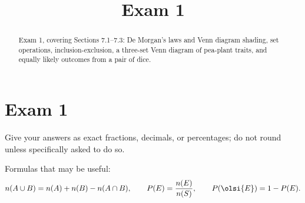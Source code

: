 \documentclass[12pt]{ximera}
\title{Exam 1}
\begin{document}
\begin{abstract}
Exam 1, covering Sections 7.1--7.3: De Morgan's laws and Venn diagram shading, set
operations, inclusion-exclusion, a three-set Venn diagram of pea-plant traits, and
equally likely outcomes from a pair of dice.
\end{abstract}
\maketitle

\section*{Exam 1}

Give your answers as exact fractions, decimals, or percentages; do not round unless
specifically asked to do so.

Formulas that may be useful:
\[
n(A\cup B) = n(A) + n(B) - n(A\cap B), \qquad
P(E) = \frac{n(E)}{n(S)}, \qquad
P\!\left(\olsi{E}\right)=1-P(E).
\]
\end{document}

